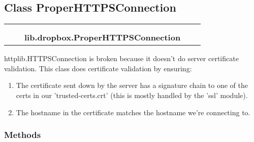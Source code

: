 
\subsection{Class ProperHTTPSConnection}

    \label{lib:dropbox:ProperHTTPSConnection}
\begin{tabular}{cccccc}
\multicolumn{2}{r}{\settowidth{\BCL}{httplib.HTTPConnection}\multirow{2}{\BCL}{httplib.HTTPConnection}}
&&
  \\\cline{3-3}
  &&\multicolumn{1}{c|}{}
&&
  \\
&&\multicolumn{2}{l}{\textbf{lib.dropbox.ProperHTTPSConnection}}
\end{tabular}

httplib.HTTPSConnection is broken because it doesn't do server certificate 
validation.  This class does certificate validation by ensuring:

\begin{enumerate}

\setlength{\parskip}{0.5ex}
  \item The certificate sent down by the server has a signature chain to one of
    the certs in our 'trusted-certs.crt' (this is mostly handled by the 
    'ssl' module).

  \item The hostname in the certificate matches the hostname we're connecting 
    to.

\end{enumerate}



  \subsubsection{Methods}

    \vspace{0.5ex}

